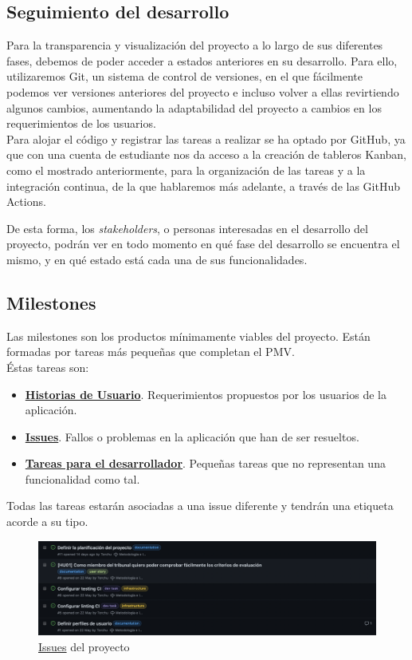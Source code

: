 \subsection{Seguimiento del desarrollo}
Para la transparencia y visualización del proyecto a lo largo de sus diferentes fases, debemos de poder acceder a
estados anteriores en su desarrollo. Para ello, utilizaremos Git, un sistema de control de versiones, en el que
fácilmente podemos ver versiones anteriores del proyecto e incluso volver a ellas revirtiendo algunos cambios,
aumentando la adaptabilidad del proyecto a cambios en los requerimientos de los usuarios.\\

Para alojar el código y registrar las tareas a realizar se ha optado por GitHub, ya que con una cuenta de estudiante
nos da acceso a la creación de tableros Kanban, como el mostrado anteriormente, para la organización de las tareas y a
la integración continua, de la que hablaremos más adelante, a través de las GitHub Actions.

De esta forma, los \textit{stakeholders}, o personas interesadas en el desarrollo del proyecto, podrán ver en todo
momento en qué fase del desarrollo se encuentra el mismo, y en qué estado está cada una de sus funcionalidades.\\

\subsection{Milestones}
Las milestones son los productos mínimamente viables del proyecto. Están formadas por tareas más pequeñas que completan
el PMV.\\

Éstas tareas son:
\begin{itemize}
    \item \href{https://github.com/Torchu/flixbuff/labels/user story}{\textbf{Historias de Usuario}}. Requerimientos
    propuestos por los usuarios de la aplicación.
    \item \href{https://github.com/Torchu/flixbuff/labels/issue}{\textbf{Issues}}. Fallos o problemas en la aplicación
    que han de ser resueltos.
    \item \href{https://github.com/Torchu/flixbuff/labels/dev task}{\textbf{Tareas para el desarrollador}}. Pequeñas
    tareas que no representan una funcionalidad como tal.
\end{itemize}

Todas las tareas estarán asociadas a una issue diferente y tendrán una etiqueta acorde a su tipo.
\begin{figure}[H]
	\centering	
	\includegraphics[scale=0.25]{img/issues.png}
	\caption{\href{https://github.com/Torchu/flixbuff/issues}{Issues} del proyecto}\label{fig:github_issues}
\end{figure}


